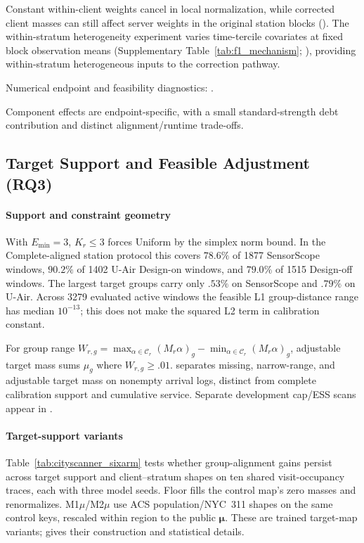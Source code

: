 \documentclass[letterpaper,journal]{IEEEtran}
\begin{document}
Constant within-client weights cancel in local normalization, while corrected
client masses can still affect server weights in the original station blocks ().
The within-stratum heterogeneity experiment varies time-tercile covariates at fixed block observation means
(Supplementary Table~\ref{tab:f1_mechanism}; ), providing within-stratum heterogeneous
inputs to the correction pathway.

Numerical endpoint and feasibility diagnostics:
.

Component effects are endpoint-specific, with a small standard-strength debt
contribution and distinct alignment/runtime trade-offs.

\subsection{Target Support and Feasible Adjustment (RQ3)}
\label{subsec:rq3_adjustment}
\label{subsec:ceiling}

\paragraph{Support and constraint geometry}

With $E_{\min}=3$, $K_r\le3$ forces Uniform by the simplex norm bound.
In the Complete-aligned station protocol this covers $78.6\%$ of 1877 SensorScope windows,
$90.2\%$ of 1402 U-Air Design-on windows, and $79.0\%$ of 1515 Design-off
windows.  The largest target groups carry only $.53\%$ on SensorScope and $.79\%$ on U-Air.
Across 3279 evaluated active windows the feasible L1 group-distance range has
median $10^{-13}$; this does not make the squared L2 term in calibration constant.

For group range $W_{r,g}=\max_{\alpha\in\mathcal C_r}(M_r\alpha)_g-
\min_{\alpha\in\mathcal C_r}(M_r\alpha)_g$, adjustable target mass sums
$\mu_g$ where $W_{r,g}\ge.01$.
 separates missing, narrow-range, and adjustable
target mass on nonempty arrival logs, distinct from complete calibration
support and cumulative service. Separate development cap/ESS scans appear in
.

\paragraph{Target-support variants}
\label{subsec:cityscanner_target_support}
Table~\ref{tab:cityscanner_sixarm} tests whether group-alignment gains persist
across target support and client--stratum shapes on ten shared visit-occupancy
traces, each with three model seeds. Floor fills the control map's zero masses
and renormalizes. M1$\mu$/M2$\mu$ use ACS population/NYC~311 shapes on the
same control keys, rescaled within region to the public $\boldsymbol\mu$.
These are trained target-map variants; 
gives their construction and statistical details.
\end{document}
